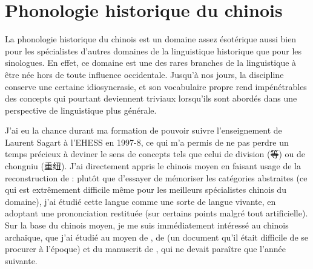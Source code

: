 \documentclass[oldfontcommands,oneside,a4paper,11pt]{memoir}
\newcommand{\zh}[1]{{\cn #1}}
\begin{document}
\section{Phonologie historique du chinois}
La phonologie historique du chinois est un domaine assez ésotérique aussi bien pour les spécialistes d'autres domaines de la linguistique historique que pour les sinologues. En effet, ce domaine est une des rares branches de la linguistique à être née hors de toute influence occidentale. Jusqu'à nos jours, la discipline conserve une certaine idiosyncrasie, et son vocabulaire propre rend impénétrables des concepts qui pourtant deviennent triviaux lorsqu'ils sont abordés dans une perspective de linguistique plus générale. 

J'ai eu la chance durant ma formation de pouvoir suivre l'enseignement de Laurent Sagart à l'EHESS en 1997-8, ce qui m'a permis de ne pas perdre   un temps précieux à deviner le sens de concepts  
tels que celui de division (\zh{等}) ou de chongniu (\zh{重纽}). J'ai directement appris le chinois moyen en faisant usage de la reconstruction de \citet{baxter92}: plutôt que d'essayer de mémoriser les catégories abstraites (ce qui est extrêmement difficile même pour les meilleurs spécialistes chinois du domaine), j'ai étudié cette langue comme une sorte de langue vivante, en adoptant une prononciation restituée (sur certains points malgré tout artificielle). Sur la base du chinois moyen, je me suis immédiatement intéressé au chinois archaïque, que j'ai étudié au moyen de \citet{baxter92}, de \citet{starostin89} (un document qu'il était difficile de se procurer à l'époque) et du manuscrit de \citet{sagart99roc}, qui ne devait paraître que l'année suivante.
\end{document}

